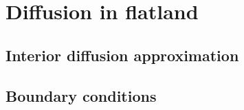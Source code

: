 \section{Diffusion in flatland}

\subsection{Interior diffusion approximation}

\subsection{Boundary conditions}


